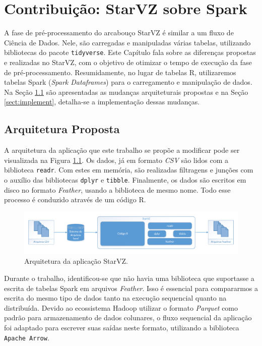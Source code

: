\chapter{Contribuição: StarVZ sobre Spark} \label{ch:contribution}

A fase de pré-processamento do arcabouço StarVZ é similar a um fluxo de Ciência 
de Dados. Nele, são carregadas e manipuladas várias tabelas, utilizando 
bibliotecas do pacote \texttt{tidyverse}. Este Capítulo fala sobre as diferenças 
propostas e realizadas no StarVZ, com o objetivo de otimizar o tempo de 
execução da fase de pré-processamento. Resumidamente, no lugar de tabelas R, 
utilizaremos tabelas Spark (\emph{Spark Dataframes}) para o carregamento e 
manipulação de dados. Na Seção \ref{sect:arch} são apresentadas as mudanças 
arquiteturais propostas e na Seção \ref{sect:implement}, detalha-se a 
implementação dessas mudanças.

\section{Arquitetura Proposta} \label{sect:arch}

A arquitetura da aplicação que este trabalho se propõe a modificar pode ser 
visualizada na Figura \ref{fig:starvz-app}. Os dados, já em formato 
\textit{CSV} são lidos com a biblioteca \texttt{readr}. Com estes em memória, 
são realizadas filtragens e junções com o auxílio das bibliotecas \texttt{dplyr} 
e \texttt{tibble}. Finalmente, os dados são escritos em disco no formato 
\textit{Feather}, usando a biblioteca de mesmo nome. Todo esse processo é 
conduzido através de um código R.

\begin{figure}[ht]
 \centerline{\includegraphics[width=1\textwidth]{./img/starvz-arch.pdf}}
 \caption{Arquitetura da aplicação StarVZ.}
 \label{fig:starvz-app}
\end{figure}

Durante o trabalho, identificou-se que não havia uma biblioteca que suportasse a 
escrita de tabelas Spark em arquivos \textit{Feather}. Isso é essencial para 
compararmos a escrita do mesmo tipo de dados tanto na execução sequencial quanto 
na distribuída. Devido ao ecossistema Hadoop utilizar o formato \textit{Parquet} 
\cite{ref:parquet} como padrão para armazenamento de dados colunares, o fluxo 
sequencial da aplicação foi adaptado para escrever suas saídas neste formato, 
utilizando a biblioteca \texttt{Apache Arrow}.

